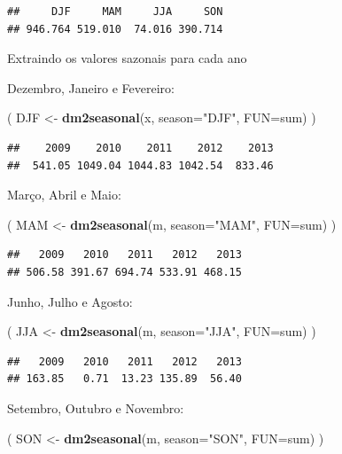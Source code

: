 \documentclass[
]{book}
\newenvironment{Shaded}{\begin{snugshade}}{\end{snugshade}}
\newcommand{\DataTypeTok}[1]{\textcolor[rgb]{0.13,0.29,0.53}{#1}}
\newcommand{\KeywordTok}[1]{\textcolor[rgb]{0.13,0.29,0.53}{\textbf{#1}}}
\newcommand{\NormalTok}[1]{#1}
\newcommand{\StringTok}[1]{\textcolor[rgb]{0.31,0.60,0.02}{#1}}
\begin{document}
\begin{verbatim}
##     DJF     MAM     JJA     SON 
## 946.764 519.010  74.016 390.714
\end{verbatim}

Extraindo os valores sazonais para cada ano

Dezembro, Janeiro e Fevereiro:

\begin{Shaded}
\begin{Highlighting}[]
\NormalTok{( DJF <-}\StringTok{ }\KeywordTok{dm2seasonal}\NormalTok{(x, }\DataTypeTok{season=}\StringTok{"DJF"}\NormalTok{, }\DataTypeTok{FUN=}\NormalTok{sum) )}
\end{Highlighting}
\end{Shaded}

\begin{verbatim}
##    2009    2010    2011    2012    2013 
##  541.05 1049.04 1044.83 1042.54  833.46
\end{verbatim}

Março, Abril e Maio:

\begin{Shaded}
\begin{Highlighting}[]
\NormalTok{( MAM <-}\StringTok{ }\KeywordTok{dm2seasonal}\NormalTok{(m, }\DataTypeTok{season=}\StringTok{"MAM"}\NormalTok{, }\DataTypeTok{FUN=}\NormalTok{sum) )}
\end{Highlighting}
\end{Shaded}

\begin{verbatim}
##   2009   2010   2011   2012   2013 
## 506.58 391.67 694.74 533.91 468.15
\end{verbatim}

Junho, Julho e Agosto:

\begin{Shaded}
\begin{Highlighting}[]
\NormalTok{( JJA <-}\StringTok{ }\KeywordTok{dm2seasonal}\NormalTok{(m, }\DataTypeTok{season=}\StringTok{"JJA"}\NormalTok{, }\DataTypeTok{FUN=}\NormalTok{sum) )}
\end{Highlighting}
\end{Shaded}

\begin{verbatim}
##   2009   2010   2011   2012   2013 
## 163.85   0.71  13.23 135.89  56.40
\end{verbatim}

Setembro, Outubro e Novembro:

\begin{Shaded}
\begin{Highlighting}[]
\NormalTok{( SON <-}\StringTok{ }\KeywordTok{dm2seasonal}\NormalTok{(m, }\DataTypeTok{season=}\StringTok{"SON"}\NormalTok{, }\DataTypeTok{FUN=}\NormalTok{sum) )}
\end{Highlighting}
\end{Shaded}
\end{document}
